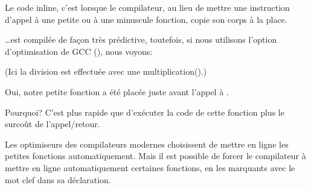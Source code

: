 \label{inline_code}

Le code inline, c'est lorsque le compilateur, au lieu de mettre une instruction
d'appel à une petite ou à une minuscule fonction, copie son corps à la place.



\dots est compilée de façon très prédictive, toutefois, si nous utilisons l'option
d'optimisation de GCC (\Othree), nous voyons:



(Ici la division est effectuée avec une multiplication().)

Oui, notre petite fonction  a été placée juste avant
l'appel à \printf.

Pourquoi? C'est plus rapide que d'exécuter la code de cette fonction plus le surcoût
de l'appel/retour.

Les optimiseurs des compilateurs modernes choisissent de mettre en ligne les petites
fonctions automatiquement.
Mais il est possible de forcer le compilateur à mettre en ligne automatiquement certaines
fonctions, en les marquants avec le mot clef  dans sa déclaration.


